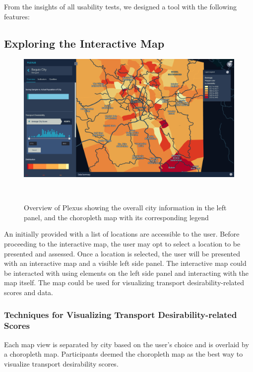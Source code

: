 \documentclass{sigchi}
\begin{document}
From the insights of all usability tests, we designed a tool with the following features: 

\subsection{Exploring the Interactive Map}


\begin{figure}
\centering
  \includegraphics[width=0.9\columnwidth]{figures/overview.PNG}
  \caption{Overview of Plexus showing the overall city information in the left panel, and the choropleth map with its corresponding legend }~\label{fig:KeplerInitialView}
\end{figure}

An initially provided with a list of locations are accessible to the user. Before proceeding to the interactive map, the user may opt to select a location to be presented and assessed. Once a location is selected, the user will be presented with an interactive map and a visible left side panel. The interactive map could be interacted with using elements on the left side panel and interacting with the map itself. The map could be used for visualizing transport desirability-related scores and data.

\subsubsection{Techniques for Visualizing Transport Desirability-related Scores}
Each map view is separated by city based on the user's choice and is overlaid by a choropleth map. Participants deemed the choropleth map as the best way to visualize transport desirability scores. 
\end{document}
